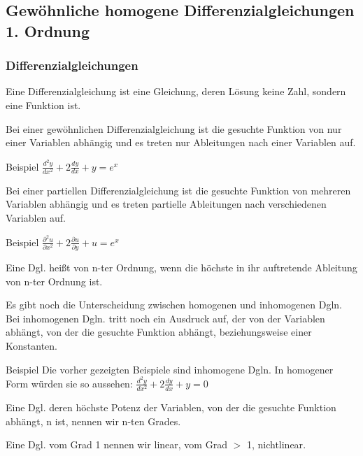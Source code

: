 \documentclass[
	11pt, %
]{beamer}
\begin{document}
\subsection{Gew\"ohnliche homogene Differenzialgleichungen 1. Ordnung}
\begin{frame}
	\frametitle{Differenzialgleichungen}
	
	\begin{definition}
		Eine \alert{Differenzialgleichung} ist eine Gleichung, deren L\"osung keine Zahl, sondern eine Funktion ist. 
	\end{definition}
	\begin{definition}
		Bei einer \alert{gew\"ohnlichen Differenzialgleichung} ist die gesuchte Funktion von nur einer Variablen abh\"angig und es treten nur Ableitungen nach einer Variablen auf.
	\end{definition}
	\begin{exampleblock}{Beispiel}
		$	\frac{d^2y}{dx^2} + 2\frac{dy}{dx} + y = e^x$
	\end{exampleblock}
\end{frame}
\begin{frame}
	\begin{definition}
		Bei einer \alert{partiellen Differenzialgleichung} ist die gesuchte Funktion von mehreren Variablen abh\"angig und es treten partielle Ableitungen nach verschiedenen Variablen auf.
	\end{definition}
	\begin{exampleblock}{Beispiel}
		$\frac{\partial^2u}{\partial x^2} + 2\frac{\partial u}{\partial y} + u = e^x$
	\end{exampleblock}
	\begin{definition}
		Eine Dgl. heißt von \alert{n-ter Ordnung}, wenn die höchste in ihr auftretende Ableitung von n-ter Ordnung ist.
	\end{definition}
\end{frame}
\begin{frame}
	\begin{definition}
		Es gibt noch die Unterscheidung zwischen \alert{homogenen} und \alert{inhomogenen} Dgln. Bei inhomogenen Dgln. tritt noch ein Ausdruck auf, der von der Variablen abh\"angt, von der die gesuchte Funktion abh\"angt, beziehungsweise einer Konstanten.
	\end{definition}
	\begin{exampleblock}{Beispiel}
		Die vorher gezeigten Beispiele sind inhomogene Dgln. In homogener Form w\"urden sie so aussehen:
		$	\frac{d^2y}{dx^2} + 2\frac{dy}{dx} + y = 0$
	\end{exampleblock}
\end{frame}
\begin{frame}
	\begin{definition}
		Eine Dgl. deren h\"ochste Potenz der Variablen, von der die gesuchte Funktion abh\"angt, n ist, nennen wir \alert{n-ten Grades}.
	\end{definition}
	\begin{definition}
		Eine Dgl. vom Grad 1 nennen wir \alert{linear}, vom Grad $>$ 1, \alert{nichtlinear}.
	\end{definition}
\end{frame}
\end{document}
